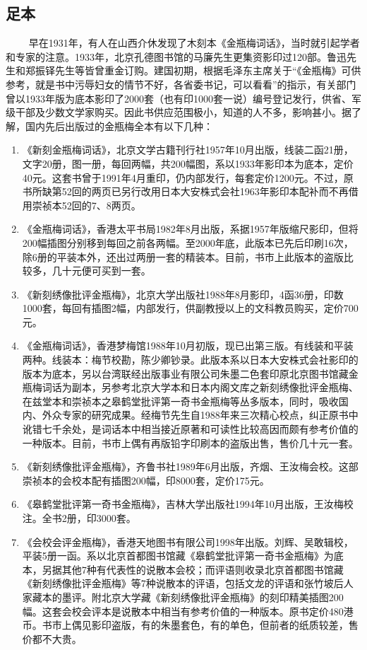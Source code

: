 \subsection{足本}

　　 早在1931年，有人在山西介休发现了木刻本《金瓶梅词话》，当时就引起学者和专家的注意。1933年，北京孔德图书馆的马廉先生更集资影印过120部。鲁迅先生和郑振铎先生等皆曾重金订购。建国初期，根据毛泽东主席关于“《金瓶梅》可供参考，就是书中污辱妇女的情节不好，各省委书记，可以看看”的指示，有关部门曾以1933年版为底本影印了2000套（也有印1000套一说）编号登记发行，供省、军级干部及少数文学家购买。因此书供应范围极小，知道的人不多，影响甚小。据了解，国内先后出版过的金瓶梅全本有以下几种：
\begin{enumerate}
\item 《新刻金瓶梅词话》，北京文学古籍刊行社1957年10月出版，线装二函21册，文字20册，图一册，每回两幅，共200幅图，系以1933年影印本为底本，定价40元。这套书曾于1991年4月重印，仍内部发行，每套定价1200元。不过，原书所缺第52回的两页已另行改用日本大安株式会社1963年影印本配补而不再借用崇祯本52回的7、8两页。
\item 《金瓶梅词话》，香港太平书局1982年8月出版，系据1957年版缩尺影印，但将200幅插图分别移到每回之前各两幅。至2000年底，此版本已先后印刷16次，除6册的平装本外，还出过两册一套的精装本。目前，书市上此版本的盗版比较多，几十元便可买到一套。
\item 《新刻绣像批评金瓶梅》，北京大学出版社1988年8月影印，4函36册，印数1000套，每回有插图2幅，内部发行，供副教授以上的文科教员购买，定价700元。
\item 《金瓶梅词话》，香港梦梅馆1988年10月初版，现已出第三版。有线装和平装两种。线装本：梅节校勘，陈少卿钞录。此版本系以日本大安株式会社影印的版本为底本，另以台湾联经出版事业有限公司朱墨二色套印原北京图书馆藏金瓶梅词话为副本，另参考北京大学本和日本内阁文库之新刻绣像批评金瓶梅、在兹堂本和崇祯本之皋鹤堂批评第一奇书金瓶梅等丛多版本，同时，吸收国内、外众专家的研究成果。经梅节先生自1988年来三次精心校点，纠正原书中讹错七千余处，是词话本中相当接近原著和可读性比较高因而颇有参考价值的一种版本。目前，书市上偶有再版铅字印刷本的盗版出售，售价几十元一套。
\item 《新刻绣像批评金瓶梅》，齐鲁书社1989年6月出版，齐烟、王汝梅会校。这部崇祯本的会校本配有插图200幅，印8000套，定价175元。
\item 《皋鹤堂批评第一奇书金瓶梅》，吉林大学出版社1994年10月出版，王汝梅校注。全书2册，印3000套。
\item 《会校会评金瓶梅》，香港天地图书有限公司1998年出版。刘辉、吴敢辑校，平装5册一函。系以北京首都图书馆藏《皋鹤堂批评第一奇书金瓶梅》为底本，另据其他7种有代表性的说散本会校；而评语则收录北京首都图书馆藏《新刻绣像批评金瓶梅》等7种说散本的评语，包括文龙的评语和张竹坡后人家藏本的墨评。附北京大学藏《新刻绣像批评金瓶梅》的刻印精美插图200幅。这套会校会评本是说散本中相当有参考价值的一种版本。原书定价480港币。书市上偶见影印盗版，有的朱墨套色，有的单色，但前者的纸质较差，售价都不大贵。
\end{enumerate}

